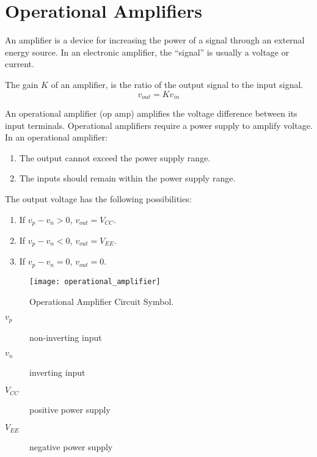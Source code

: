 \documentclass{article}
\begin{document}
\section{Operational Amplifiers}
\begin{definition}[Amplifier]
    An amplifier is a device for increasing the power of a signal through an external energy source. 
    In an electronic amplifier, the ``signal'' is usually a voltage or current.
\end{definition}
\begin{definition}[Gain]
    The gain $K$ of an amplifier, is the ratio of the output signal to the input signal.
    \begin{equation*}
        v_{out} = K v_{in}
    \end{equation*}
\end{definition}
\begin{definition}
    An operational amplifier (op amp) amplifies the voltage difference between its input terminals. 
    Operational amplifiers require a power supply to amplify voltage.
    In an operational amplifier:
    \begin{enumerate}
        \item The output cannot exceed the power supply range.
        \item The inputs should remain within the power supply range.
    \end{enumerate}
    The output voltage has the following possibilities:
    \begin{enumerate}
        \item If $v_p - v_n > 0$, $v_{out} = V_{CC}$. 
        \item If $v_p - v_n < 0$, $v_{out} = V_{EE}$. 
        \item If $v_p - v_n = 0$, $v_{out} = 0$. 
    \end{enumerate}
    \begin{figure}[H]
        \centering
        \texttt{[image: operational\_amplifier]}
        \caption{Operational Amplifier Circuit Symbol.}
    \end{figure}
    \begin{description}
        \item[$v_p$] non-inverting input
        \item[$v_n$] inverting input
        \item[$V_{CC}$] positive power supply
        \item[$V_{EE}$] negative power supply
    \end{description}
\end{definition}
\end{document}
